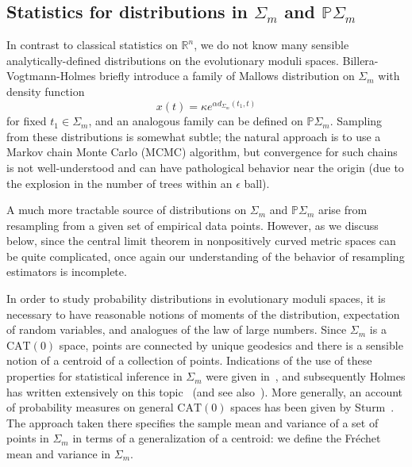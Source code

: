 \documentclass[a4paper,11pt]{article}
\newcommand{\CAT}{\textrm{CAT}}
\begin{document}
\subsection{Statistics for distributions in $\Sigma_m$ and $\mathbb{P}\Sigma_m$}

In contrast to classical statistics on $\mathbb{R}^n$, we do not know many sensible analytically-defined distributions on the evolutionary moduli spaces.
Billera-Vogtmann-Holmes briefly introduce a family of Mallows distribution on $\Sigma_m$ with density function
\[
x(t) = \kappa e^{\alpha d_{\Sigma_m}(t_1, t)}
\] 
for fixed $t_1 \in \Sigma_m$, and an analogous family can be defined on $\mathbb{P}\Sigma_m$.
Sampling from these distributions is somewhat subtle; the natural approach is to use a Markov chain Monte Carlo (MCMC) algorithm, but convergence for such chains is not well-understood and can have pathological behavior near the origin (due to the explosion in the number of trees within an $\epsilon$ ball).


A much more tractable source of distributions on $\Sigma_m$ and $\mathbb{P}\Sigma_m$ arise from resampling from a given set of empirical data points.
However, as we discuss below, since the central limit theorem in nonpositively curved metric spaces can be quite complicated, once again our understanding of the behavior of resampling estimators is incomplete.

In order to study probability distributions in evolutionary moduli spaces, it is necessary to have reasonable notions of moments of the distribution, expectation of random variables, and analogues of the law of large numbers.
Since $\Sigma_m$ is a $\CAT(0)$ space, points are connected by unique geodesics and there is a sensible notion of a centroid of a collection of points.
Indications of the use of these properties for statistical inference in $\Sigma_m$ were given in~\cite{billera2001geometry}, and subsequently Holmes has written extensively on this topic~\cite{holmes2003bootstrapping, holmes2003bootstrapping, holmes2005statistical} (and see also~\cite{feragen2013tree}).
More generally, an account of probability measures on general $\CAT(0)$ spaces has been given by Sturm~\cite{sturm2003probability}.
The approach taken there specifies the sample mean and variance of a set of points in $\Sigma_m$ in terms of a generalization of a centroid: we define the Fr\'echet mean and variance in $\Sigma_m$.
\end{document}
